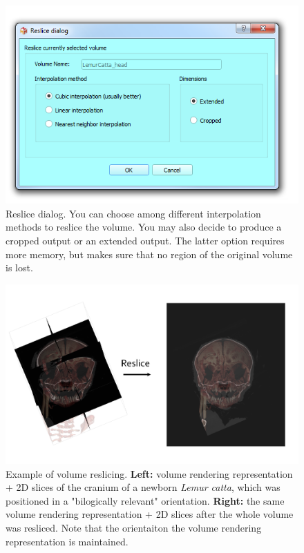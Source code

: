 \begin{figure}
  \centering
  \includegraphics[scale=0.5]{images/14/reslice/reslice_dialog.png}
\caption{Reslice dialog. You can choose among different interpolation methods to reslice the volume. You may also decide to produce a cropped output or an extended output. The latter option requires more memory, but makes sure that no region of the original volume is lost.}	
\label{reslice_dialog}
 \end{figure}


\begin{figure}
  \centering
  \includegraphics[scale=0.35]{images/14/reslice/reslice_example.png}
\caption{ Example of volume reslicing. \textbf{Left:} volume rendering representation + 2D slices of the cranium of a newborn \textit{Lemur catta}, which was positioned in a "bilogically relevant" orientation. \textbf{Right:} the same volume rendering representation + 2D slices after the whole volume was resliced. Note that the orientaiton the volume rendering representation is maintained.}	
\label{resample_example}
 \end{figure}




